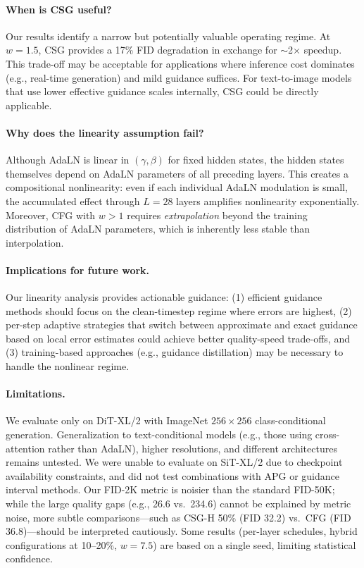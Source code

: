 \documentclass{article}
\newcommand{\adaln}{AdaLN}
\begin{document}
\paragraph{When is CSG useful?}
Our results identify a narrow but potentially valuable operating regime. At $w = 1.5$, CSG provides a 17\% FID degradation in exchange for $\sim$2$\times$ speedup. This trade-off may be acceptable for applications where inference cost dominates (e.g., real-time generation) and mild guidance suffices. For text-to-image models that use lower effective guidance scales internally, CSG could be directly applicable.

\paragraph{Why does the linearity assumption fail?}
Although \adaln{} is linear in $(\gamma, \beta)$ for fixed hidden states, the hidden states themselves depend on \adaln{} parameters of all preceding layers. This creates a compositional nonlinearity: even if each individual \adaln{} modulation is small, the accumulated effect through $L = 28$ layers amplifies nonlinearity exponentially. Moreover, CFG with $w > 1$ requires \textit{extrapolation} beyond the training distribution of \adaln{} parameters, which is inherently less stable than interpolation.

\paragraph{Implications for future work.}
Our linearity analysis provides actionable guidance: (1) efficient guidance methods should focus on the clean-timestep regime where errors are highest, (2) per-step adaptive strategies that switch between approximate and exact guidance based on local error estimates could achieve better quality-speed trade-offs, and (3) training-based approaches (e.g., guidance distillation) may be necessary to handle the nonlinear regime.

\paragraph{Limitations.}
We evaluate only on DiT-XL/2 with ImageNet $256\times 256$ class-conditional generation. Generalization to text-conditional models (e.g., those using cross-attention rather than \adaln{}), higher resolutions, and different architectures remains untested. We were unable to evaluate on SiT-XL/2 due to checkpoint availability constraints, and did not test combinations with APG or guidance interval methods. Our FID-2K metric is noisier than the standard FID-50K; while the large quality gaps (e.g., 26.6 vs.\ 234.6) cannot be explained by metric noise, more subtle comparisons---such as CSG-H 50\% (FID 32.2) vs.\ CFG (FID 36.8)---should be interpreted cautiously. Some results (per-layer schedules, hybrid configurations at 10--20\%, $w = 7.5$) are based on a single seed, limiting statistical confidence.
\end{document}
